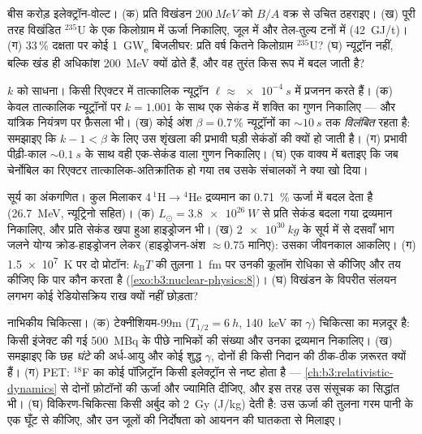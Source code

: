 \begin{exercise}[$\star\star$]\label{exo:b3:nuclear-physics:9}
बीस करोड़ इलेक्ट्रॉन-वोल्ट। (क) प्रति विखंडन $\qty{200}{MeV}$ को
$B/A$ वक्र से उचित ठहराइए। (ख) पूरी तरह विखंडित
$^{235}$U के एक किलोग्राम में ऊर्जा निकालिए, जूल में और तेल-तुल्य
टनों में (\qty{42}{GJ/t})। (ग) 33\,\% दक्षता पर कोई
\qty{1}{GW_e} बिजलीघर: प्रति वर्ष कितने किलोग्राम $^{235}$U? (घ)
न्यूट्रॉन नहीं, बल्कि खंड ही अधिकांश
\qty{200}{MeV} क्यों ढोते हैं, और वह तुरंत किस रूप में बदल जाती है?
\end{exercise}

\begin{exercise}[$\star\star\star$]\label{exo:b3:nuclear-physics:10}
$k$ को साधना। किसी रिएक्टर में तात्कालिक न्यूट्रॉन $\ell
\approx \qty{e-4}{s}$ में प्रजनन करते हैं। (क) केवल तात्कालिक
न्यूट्रॉनों पर $k = 1.001$ के साथ एक सेकंड में शक्ति का गुणन निकालिए
--- और यांत्रिक नियंत्रण पर फ़ैसला भी। (ख) कोई अंश $\beta =
0.7\,\%$ न्यूट्रॉनों का $\sim\qty{10}{s}$ तक \emph{विलंबित} रहता है:
समझाइए कि $k - 1 < \beta$ के लिए उस शृंखला की प्रभावी घड़ी
सेकंडों की क्यों हो जाती है। (ग) प्रभावी पीढ़ी-काल
$\sim\qty{0.1}{s}$ के साथ वही एक-सेकंड वाला गुणन निकालिए। (घ) एक
वाक्य में बताइए कि जब चेर्नोबिल का रिएक्टर तात्कालिक-अतिक्रांतिक हो
गया तब उसके संचालकों ने क्या खो दिया।
\end{exercise}

\begin{exercise}[$\star\star\star$]\label{exo:b3:nuclear-physics:11}
सूर्य का अंकगणित। कुल मिलाकर $4\,^1\text{H} \to {}^4\text{He}$
द्रव्यमान का \qty{0.71}{\percent} ऊर्जा में बदल देता है
(\qty{26.7}{MeV}, न्यूट्रिनो सहित)। (क) $L_\odot =
\qty{3.8e26}{W}$ से प्रति सेकंड बदला गया द्रव्यमान निकालिए, और
प्रति सेकंड खपा हुआ हाइड्रोजन भी। (ख) $\qty{2e30}{kg}$ के सूर्य
में से दसवाँ भाग जलने योग्य क्रोड-हाइड्रोजन लेकर (हाइड्रोजन-अंश
$\approx0.75$ मानिए): उसका जीवनकाल आकलिए। (ग)
\qty{1.5e7}{K} पर दो प्रोटॉन: $k_{\text{B}}T$ की तुलना
\qty{1}{fm} पर उनकी कूलॉम रोधिका से कीजिए और तय कीजिए कि पार कौन
करता है (\cref{exo:b3:nuclear-physics:8})। (घ) विखंडन के विपरीत
संलयन लगभग कोई रेडियोसक्रिय राख क्यों नहीं छोड़ता?
\end{exercise}

\begin{exercise}[$\star\star\star$]\label{exo:b3:nuclear-physics:12}
नाभिकीय चिकित्सा। (क) टेक्नीशियम-99m ($T_{1/2} = \qty{6}{h}$,
\qty{140}{keV} का $\gamma$) चिकित्सा का मज़दूर है: किसी इंजेक्ट की
गई \qty{500}{MBq} के पीछे नाभिकों की संख्या और
उनका द्रव्यमान निकालिए। (ख) समझाइए कि छह \emph{घंटे} की अर्ध-आयु और
कोई शुद्ध $\gamma$, दोनों ही किसी निदान की ठीक-ठीक ज़रूरत क्यों हैं। (ग)
PET: $^{18}$F का कोई पॉज़िट्रॉन किसी इलेक्ट्रॉन से नष्ट होता है ---
\cref{ch:b3:relativistic-dynamics} से दोनों फ़ोटॉनों की ऊर्जा और
ज्यामिति दीजिए, और इस तरह उस संसूचक का सिद्धांत भी।
(घ) विकिरण-चिकित्सा किसी अर्बुद को \qty{2}{Gy} (\unit{J/kg}) देती है:
उस ऊर्जा की तुलना गरम पानी के एक घूँट से कीजिए, और उन जूलों की
निर्दोषता को आयनन की घातकता से मिलाइए।
\end{exercise}

